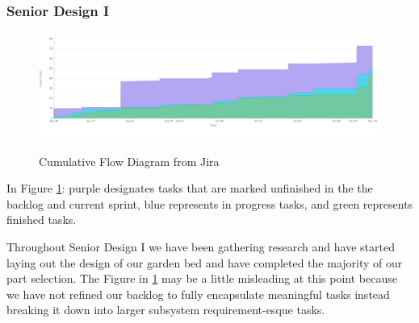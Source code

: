 \subsubsection{Senior Design I}
\begin{figure}[H]
    \caption{Cumulative Flow Diagram from Jira}
    \centering
    \includegraphics[width=\textwidth]{images/Cumulative flow diagram.png}
    \label{fig:cumulativeflow}
\end{figure}
In Figure \ref{fig:cumulativeflow}: purple designates tasks that are marked unfinished in the the backlog and current sprint, blue represents in progress tasks, and green represents finished tasks.

Throughout Senior Design I we have been gathering research and have started laying out the design of our garden bed and have completed the majority of our part selection. The Figure in \ref{fig:cumulativeflow} may be a little misleading at this point because we have not refined our backlog to fully encapsulate meaningful tasks instead breaking it down into larger subsystem requirement-esque tasks.

